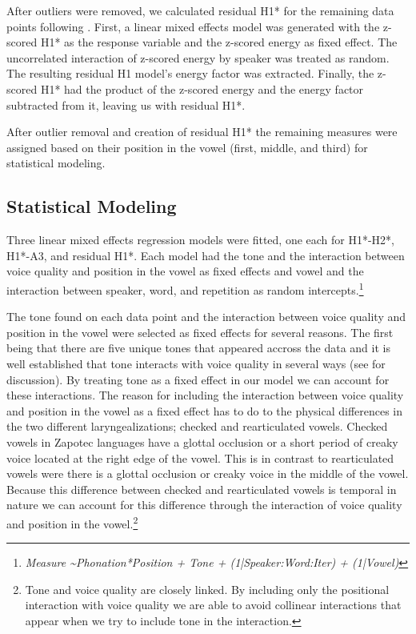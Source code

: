 \documentclass[12pt, letterpaper]{article}
\begin{document}
After outliers were removed, we calculated residual H1* for the remaining data points following \citet{chaiH1H2Acoustic2022}. First, a linear mixed effects model was generated with the z-scored H1* as the response variable and the z-scored energy as fixed effect. 
The uncorrelated interaction of z-scored energy by speaker was treated as random. The resulting residual H1 model’s energy factor was extracted. Finally, the z-scored H1* had the product of the z-scored energy and the energy factor subtracted from it, leaving us with residual H1*.

After outlier removal and creation of residual H1* the remaining measures were assigned based on their position in the vowel (first, middle, and third) for statistical modeling.  

\subsection{Statistical Modeling} \label{sec:Statistics}

Three linear mixed effects regression models were fitted, one each for H1*-H2*, H1*-A3, and residual H1*. Each model had the tone and the interaction between voice quality and position in the vowel as fixed effects and vowel and the interaction between speaker, word, and repetition as random intercepts.\footnote{ \textit{Measure \sim  Phonation*Position + Tone + (1|Speaker:Word:Iter) + (1|Vowel)}} 

The tone found on each data point and the interaction between voice quality and position in the vowel were selected as fixed effects for several reasons. The first being that there are five unique tones that appeared accross the data and it is well established that tone interacts with voice quality in several ways (see \cite{espositoCrossLinguisticPatterns2020,garellekPhoneticsVoice2019} for discussion). By treating tone as a fixed effect in our model we can account for these interactions. The reason for including the interaction between voice quality and position in the vowel as a fixed effect has to do to the physical differences in the two different laryngealizations; checked and rearticulated vowels. Checked vowels in Zapotec languages have a glottal occlusion or a short period of creaky voice located at the right edge of the vowel. This is in contrast to rearticulated vowels were there is a glottal occlusion or creaky voice in the middle of the vowel. Because this difference between checked and rearticulated vowels is temporal in nature we can account for this difference through the interaction of voice quality and position in the vowel.\footnote{Tone and voice quality are closely linked. By including only the positional interaction with voice quality we are able to avoid collinear interactions that appear when we try to include tone in the interaction.}
\end{document}
